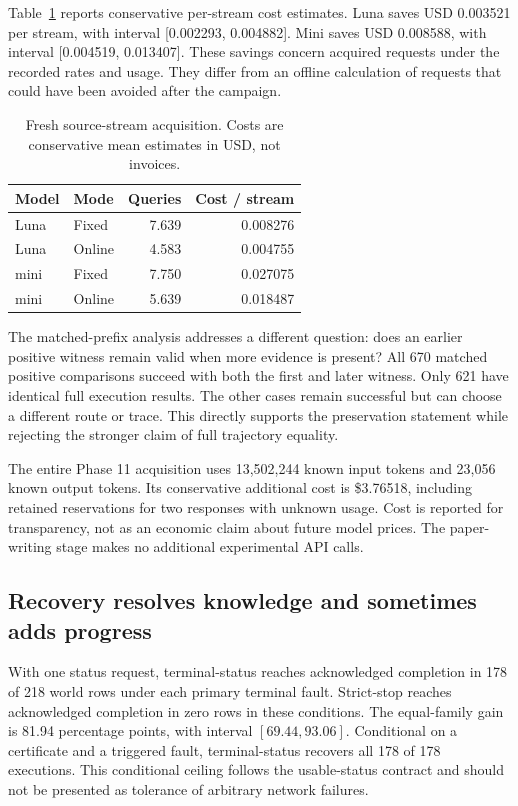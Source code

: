 \documentclass[conference]{IEEEtran}
\begin{document}
Table~\ref{tab:cost} reports conservative per-stream cost estimates. Luna saves USD 0.003521 per stream, with interval [0.002293, 0.004882]. Mini saves USD 0.008588, with interval [0.004519, 0.013407]. These savings concern acquired requests under the recorded rates and usage. They differ from an offline calculation of requests that could have been avoided after the campaign.

\begin{table}[t]
\centering
\caption{Fresh source-stream acquisition. Costs are conservative mean estimates in USD, not invoices.}
\label{tab:cost}
\begin{tabular}{llrr}
\toprule
Model & Mode & Queries & Cost / stream\\
\midrule
Luna &Fixed&7.639&0.008276\\
Luna &Online&4.583&0.004755\\
mini &Fixed&7.750&0.027075\\
mini &Online&5.639&0.018487\\
\bottomrule
\end{tabular}
\end{table}

The matched-prefix analysis addresses a different question: does an earlier positive witness remain valid when more evidence is present? All 670 matched positive comparisons succeed with both the first and later witness. Only 621 have identical full execution results. The other cases remain successful but can choose a different route or trace. This directly supports the preservation statement while rejecting the stronger claim of full trajectory equality.

The entire Phase 11 acquisition uses 13,502,244 known input tokens and 23,056 known output tokens. Its conservative additional cost is \$3.76518, including retained reservations for two responses with unknown usage. Cost is reported for transparency, not as an economic claim about future model prices. The paper-writing stage makes no additional experimental API calls.

\subsection{Recovery resolves knowledge and sometimes adds progress}
With one status request, terminal-status reaches acknowledged completion in 178 of 218 world rows under each primary terminal fault. Strict-stop reaches acknowledged completion in zero rows in these conditions. The equal-family gain is 81.94 percentage points, with interval $[69.44,93.06]$. Conditional on a certificate and a triggered fault, terminal-status recovers all 178 of 178 executions. This conditional ceiling follows the usable-status contract and should not be presented as tolerance of arbitrary network failures.
\end{document}
